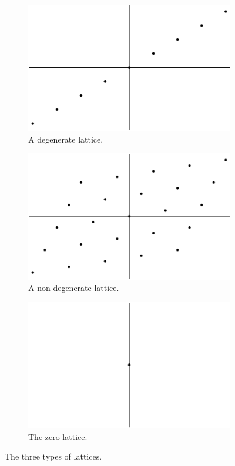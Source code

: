 \documentclass[12pt,twoside]{reedthesis}
\theoremstyle{definition}
\begin{document}
\begin{figure}[t]
  \centering
  \begin{subfigure}[t]{0.31\textwidth}
    \centering
    \includegraphics[width=\textwidth]{figures/degen_lattice.pdf}
    \caption{A degenerate lattice.}
  \end{subfigure}
  \hfill
  \begin{subfigure}[t]{0.31\textwidth}
    \centering
    \includegraphics[width=\textwidth]{figures/non_degen_lattice.pdf}
    \caption{A non-degenerate lattice.}
  \end{subfigure}
  \hfill
  \begin{subfigure}[t]{0.31\textwidth}
    \centering
    \includegraphics[width=\textwidth]{figures/zero_lattice.pdf}
    \caption{The zero lattice.}
  \end{subfigure}
  \caption{The three types of lattices.}
  \label{fig:three_types_of_lattices}
\end{figure}
\end{document}

